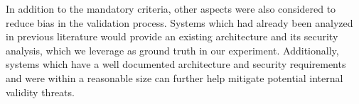 In addition to the mandatory criteria, other aspects were also considered to reduce bias in the validation process. Systems which had already been analyzed in previous literature \cite{peldszus_secure_2019, abi-antoun_static_2009} would provide an existing architecture and its security analysis, which we leverage as ground truth in our experiment. Additionally, systems which have a well documented architecture and security requirements and were within a reasonable size can further help mitigate potential internal validity threats. 